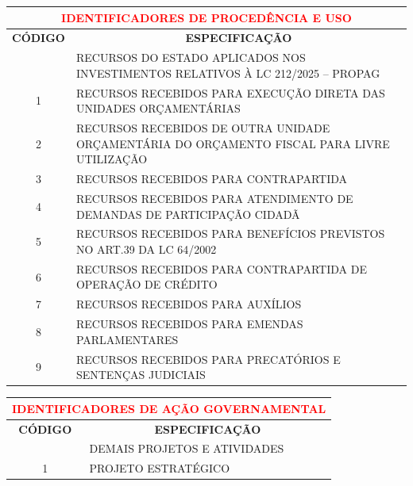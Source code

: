 \documentclass{article}
\begin{document}
\noindent\begin{longtable}[c]{m{1cm}|m{14cm}}
\multicolumn{2}{c}{\cellcolor{gray!50} \textcolor{red} {\normalsize \textbf{ IDENTIFICADORES DE PROCEDÊNCIA E USO}}}\Tstrut  \\[2ex]
\hline\hline
\multicolumn{1}{c|}{\textbf{CÓDIGO}} & \multicolumn{1}{c}{\textbf{ESPECIFICAÇÃO}} \\
\hline
\endfirsthead
\hline
\endhead
\endfoot
\hline\hline\hline
\endlastfoot
\multicolumn{1}{c|}{ 0 } & RECURSOS DO ESTADO APLICADOS NOS INVESTIMENTOS RELATIVOS À LC 212/2025 – PROPAG \\
\multicolumn{1}{c|}{ 1 } & RECURSOS RECEBIDOS PARA EXECUÇÃO DIRETA DAS UNIDADES ORÇAMENTÁRIAS \\
\multicolumn{1}{c|}{ 2 } & RECURSOS RECEBIDOS DE OUTRA UNIDADE ORÇAMENTÁRIA DO ORÇAMENTO FISCAL PARA LIVRE UTILIZAÇÃO \\
\multicolumn{1}{c|}{ 3 } & RECURSOS RECEBIDOS PARA CONTRAPARTIDA \\
\multicolumn{1}{c|}{ 4 } & RECURSOS RECEBIDOS PARA ATENDIMENTO DE DEMANDAS DE PARTICIPAÇÃO CIDADÃ \\
\multicolumn{1}{c|}{ 5 } & RECURSOS RECEBIDOS PARA BENEFÍCIOS PREVISTOS NO ART.39 DA LC 64/2002 \\
\multicolumn{1}{c|}{ 6 } & RECURSOS RECEBIDOS PARA CONTRAPARTIDA DE OPERAÇÃO DE CRÉDITO \\
\multicolumn{1}{c|}{ 7 } & RECURSOS RECEBIDOS PARA AUXÍLIOS \\
\multicolumn{1}{c|}{ 8 } & RECURSOS RECEBIDOS PARA EMENDAS PARLAMENTARES \\
\multicolumn{1}{c|}{ 9 } & RECURSOS RECEBIDOS PARA PRECATÓRIOS E SENTENÇAS JUDICIAIS \\
\end{longtable}
\newpage
\noindent\begin{longtable}[c]{m{1cm}|m{11cm}}
\multicolumn{2}{c}{\cellcolor{gray!50} \textcolor{red} {\normalsize \textbf{ IDENTIFICADORES DE AÇÃO GOVERNAMENTAL}}}\Tstrut  \\[2ex]
\hline\hline
\multicolumn{1}{c|}{\textbf{CÓDIGO}} & \multicolumn{1}{c}{\textbf{ESPECIFICAÇÃO}} \\
\hline
\endfirsthead
\hline
\endhead
\endfoot
\hline\hline\hline
\endlastfoot
\multicolumn{1}{c|}{ 0 } & DEMAIS PROJETOS E ATIVIDADES \\
\multicolumn{1}{c|}{ 1 } & PROJETO ESTRATÉGICO \\
\end{longtable}
% 
\end{document}

